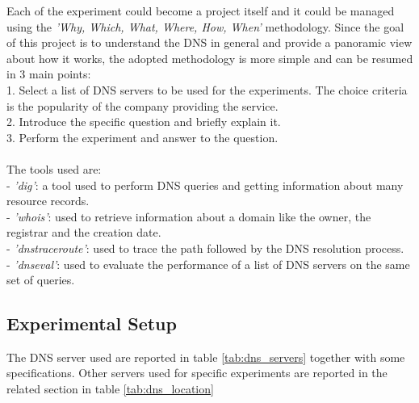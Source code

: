 \documentclass[a4paper,10pt]{article}
\begin{document}
\begin{multicols}{2}
Each of the experiment could become a project itself and it could be managed using the \textit{'Why, Which, What, Where, How, When'} methodology. Since the goal
of this project is to understand the DNS in general and provide a panoramic view about how it works, the adopted methodology is more simple and can be resumed in 3 main points:\\
1. Select a list of DNS servers to be used for the experiments. The choice criteria is the popularity of the company providing the service.\\
2. Introduce the specific question and briefly explain it.\\
3. Perform the experiment and answer to the question.\\
\\
The tools used are:\\
- \textit{'dig'}: a tool used to perform DNS queries and getting information about many resource records.\\
- \textit{'whois'}: used to retrieve information about a domain like the owner, the registrar and the creation date.\\
- \textit{'dnstraceroute'}: used to trace the path followed by the DNS resolution process.\\
- \textit{'dnseval'}: used to evaluate the performance of a list of DNS servers on the same set of queries.\\



\subsection{Experimental Setup}
The DNS server used are reported in table \ref{tab:dns_servers} together with some specifications. Other servers used for specific experiments are reported in the related section
in table \ref{tab:dns_location}
        

\end{multicols}
\end{document}
